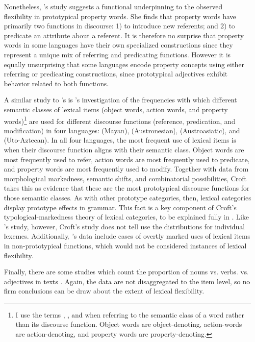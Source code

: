 Nonetheless, \citeauthor{Thompson1989}'s study suggests a functional underpinning to the observed flexibility in prototypical property words. She finds that property words have primarily two functions in discourse: 1) to introduce new referents; and 2) to predicate an attribute about a referent. It is therefore no surprise that property words in some languages have their own specialized constructions since they represent a unique mix of referring and predicating functions. However it is equally unsurprising that some languages encode property concepts using either referring or predicating constructions, since prototypical adjectives exhibit behavior related to both functions.

A similar study to \citeauthor{Thompson1989}'s is \citeauthor{Croft1991}'s \parencite*[§2.5]{Croft1991} investigation of the frequencies with which different semantic classes of lexical items (object words, action words, and property words)\footnote{I use the terms , , and  when referring to the semantic class of a word rather than its discourse function. Object words are object-denoting, action-words are action-denoting, and property words are property-denoting.} are used for different discourse functions (reference, predication, and modification) in four languages:  (Mayan),  (Austronesian),  (Austroasiatic), and  (Uto-Aztecan). In all four languages, the most frequent use of lexical items is when their discourse function aligns with their semantic class. Object words are most frequently used to refer, action words are most frequently used to predicate, and property words are most frequently used to modify. Together with data from morphological markedness, semantic shifts, and combinatorial possibilities, Croft takes this as evidence that these are the most prototypical discourse functions for those semantic classes. As with other prototype categories, then, lexical categories display prototype effects in grammar. This fact is a key component of Croft's typological-markedness theory of lexical categories, to be explained fully in . Like \citeauthor{Thompson1989}'s \parencite*{Thompson1989} study, however, Croft's study does not tell use the distributions for individual lexemes. Additionally, \citeauthor{Croft1991}'s data include cases of overtly marked uses of lexical items in non-prototypical functions, which would not be considered instances of lexical flexibility.

Finally, there are some studies which count the proportion of nouns vs. verbs. vs. adjectives in  texts \parencites{Hudson1994}{PolinskyMagyar2020}. Again, the data are not disaggregated to the item level, so no firm conclusions can be draw about the extent of lexical flexibility.

